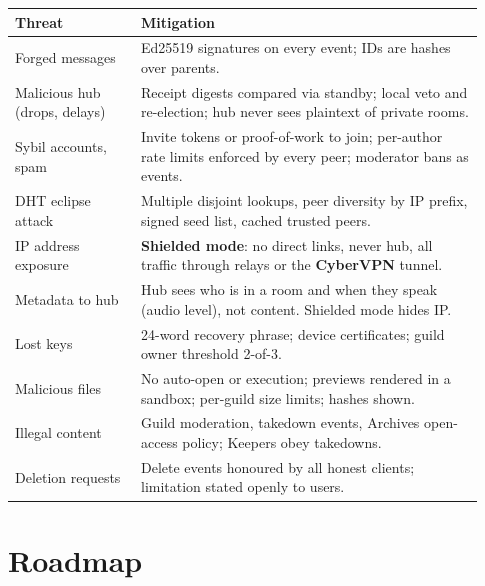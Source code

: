 \documentclass[11pt,a4paper]{article}
\begin{document}
\begin{longtable}{@{}p{0.25\linewidth}p{0.68\linewidth}@{}}
\toprule
\textbf{Threat} & \textbf{Mitigation} \\
\midrule
\endhead
Forged messages & Ed25519 signatures on every event; IDs are hashes over parents. \\
Malicious hub (drops, delays) & Receipt digests compared via standby; local veto and re-election; hub never sees plaintext of private rooms. \\
Sybil accounts, spam & Invite tokens or proof-of-work to join; per-author rate limits enforced by every peer; moderator bans as events. \\
DHT eclipse attack & Multiple disjoint lookups, peer diversity by IP prefix, signed seed list, cached trusted peers. \\
IP address exposure & \textbf{Shielded mode}: no direct links, never hub, all traffic through relays or the \textbf{CyberVPN} tunnel. \\
Metadata to hub & Hub sees who is in a room and when they speak (audio level), not content. Shielded mode hides IP. \\
Lost keys & 24-word recovery phrase; device certificates; guild owner threshold 2-of-3. \\
Malicious files & No auto-open or execution; previews rendered in a sandbox; per-guild size limits; hashes shown. \\
Illegal content & Guild moderation, takedown events, Archives open-access policy; Keepers obey takedowns. \\
Deletion requests & Delete events honoured by all honest clients; limitation stated openly to users. \\
\bottomrule
\end{longtable}

\section{Roadmap}
\end{document}
